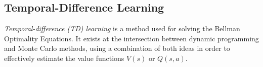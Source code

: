 \subsection{Temporal-Difference Learning}
\label{subsec:2_TD_learning}

\textit{Temporal-difference (TD) learning} is a method used for solving the Bellman Optimality Equations. It exists at the intersection between dynamic programming and Monte Carlo methods, using a combination of both ideas in order to effectively estimate the value functions $V(s)$ or $Q(s, a)$. 


